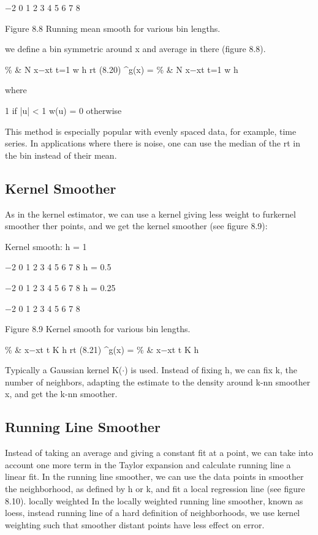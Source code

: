 $-$2 0 1 2 3 4 5 6 7 8

Figure 8.8 Running mean smooth for various bin lengths.

we define a bin symmetric around x and average in there (figure 8.8).

\% \& N x$-$xt t=1 w h rt (8.20) \textasciicircum{}g(x) = \% \& N x$-$xt t=1 w h

where

1 if |u| < 1 w(u) = 0 otherwise

This method is especially popular with evenly spaced data, for example, time series. In applications where there is noise, one can use the median of the rt in the bin instead of their mean.

\subsection{Kernel Smoother}

As in the kernel estimator, we can use a kernel giving less weight to furkernel smoother ther points, and we get the kernel smoother (see figure 8.9):

Kernel smooth: h = 1

$-$2 0 1 2 3 4 5 6 7 8 h = 0.5

$-$2 0 1 2 3 4 5 6 7 8 h = 0.25

$-$2 0 1 2 3 4 5 6 7 8

Figure 8.9 Kernel smooth for various bin lengths.

\% \& x$-$xt t K h rt (8.21) \textasciicircum{}g(x) = \% \& x$-$xt t K h

Typically a Gaussian kernel K($\cdot$) is used. Instead of fixing h, we can fix k, the number of neighbors, adapting the estimate to the density around k-nn smoother x, and get the k-nn smoother.

\subsection{Running Line Smoother}

Instead of taking an average and giving a constant fit at a point, we can take into account one more term in the Taylor expansion and calculate running line a linear fit. In the running line smoother, we can use the data points in smoother the neighborhood, as defined by h or k, and fit a local regression line (see figure 8.10). locally weighted In the locally weighted running line smoother, known as loess, instead running line of a hard definition of neighborhoods, we use kernel weighting such that smoother distant points have less effect on error.

